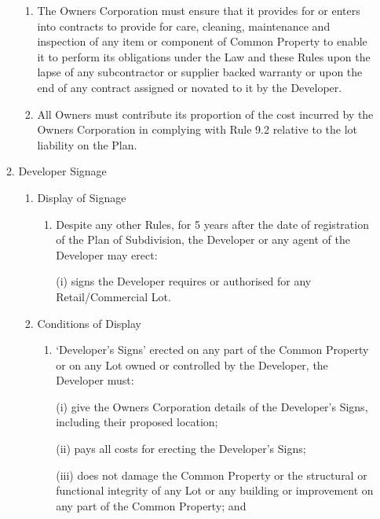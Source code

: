 \documentclass{article}
\begin{document}
\begin{enumerate}[label=\arabic*.]
\begin{enumerate}[label=\arabic{enumi}.\arabic*.]
\begin{enumerate}[label=(\arabic*)]
\item  The Owners Corporation must ensure that it provides for or enters into contracts to provide for care, cleaning, maintenance and inspection of any item or component of Common Property to enable it to perform its obligations under the Law and these Rules upon the lapse of any subcontractor or supplier backed warranty or upon the end of any contract assigned or novated to it by the Developer.

\item  All Owners must contribute its proportion of the cost incurred by the Owners Corporation in complying with Rule 9.2 relative to the lot liability on the Plan.

\end{enumerate}

\item  Developer Signage

\begin{enumerate}[label=(\arabic*)]

\item  Display of Signage

\begin{enumerate}[label=(\alph*)]

\item  Despite any other Rules, for 5 years after the date of registration of the Plan of Subdivision, the Developer or any agent of the Developer may erect:

(i) signs the Developer requires or authorised for any Retail/Commercial Lot.

\end{enumerate}

\item  Conditions of Display

\begin{enumerate}[label=(\alph*)]

\item  ‘Developer’s Signs’ erected on any part of the Common Property or on any Lot owned or controlled by the Developer, the Developer must:

(i) give the Owners Corporation details of the Developer’s Signs, including their proposed location;

(ii) pays all costs for erecting the Developer’s Signs;

(iii) does not damage the Common Property or the structural or functional integrity of any Lot or any building or improvement on any part of the Common Property; and


\end{enumerate}
\end{enumerate}
\end{enumerate}
\end{enumerate}
\end{document}
